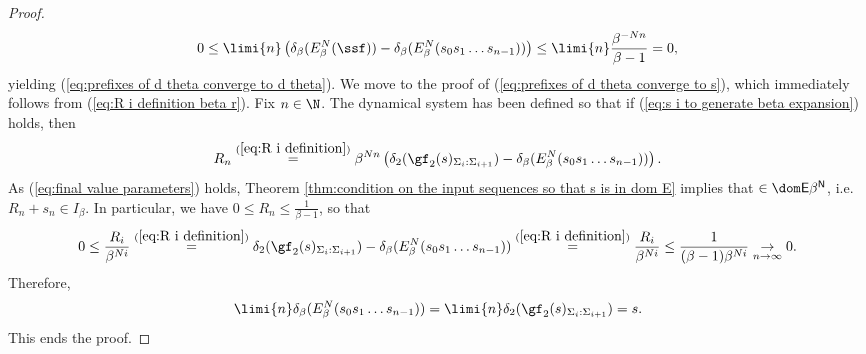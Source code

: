 \begin{proof}
	\begin{equation}
		0 \leq \limi{n} \left(\delta_\beta(E_\beta^N(\ssf)) - \delta_\beta(E_\beta^N(s_0s_1 \ldots s_{n-1}))\right) \leq \limi{n} \frac{\beta^{-Nn}}{\beta-1} = 0,
	\end{equation}
	yielding (\ref{eq:prefixes of d theta converge to d theta}). We move to the proof of (\ref{eq:prefixes of d theta converge to s}), which immediately follows from (\ref{eq:R i definition beta r}). Fix $n \in \N$. The dynamical system has been defined so that if (\ref{eq:s i to generate beta expansion}) holds, then 
	\begin{equation}
		R_n \overset{(\ref{eq:R i definition})}{=} \beta^{Nn}\left(\delta_2(\gf_2(s)_{\Sigma_i:\Sigma_{i+1}}) - \delta_\beta(E_\beta^N(s_0s_1 \ldots s_{n-1}))\right). 
	\end{equation}
	As (\ref{eq:final value parameters}) holds, Theorem \ref{thm:condition on the input sequences so that s is in dom E} implies that $\sf \in \dom E\beta^N$, i.e. $R_n + s_n \in I_\beta$. In particular, we have $0 \leq R_n \leq \frac{1}{\beta-1}$, so that
	\begin{equation}
		0 \leq \frac{R_i}{\beta^{Ni}} \overset{(\ref{eq:R i definition})}{=} \delta_2(\gf_2(s)_{\Sigma_i:\Sigma_{i+1}}) - \delta_\beta(E_\beta^N(s_0s_1 \ldots s_{n-1}))  \overset{(\ref{eq:R i definition})}{=} \frac{R_i}{\beta^{Ni}} \leq \frac{1}{(\beta-1) \beta^{Ni}} \underset{n \to \infty}{\to} 0.
	\end{equation}
	Therefore,
	\begin{equation}
		\limi{n} \delta_\beta(E_\beta^N(s_0s_1 \ldots s_{n-1})) = \limi{n} \delta_2(\gf_2(s)_{\Sigma_i:\Sigma_{i+1}}) = s.
	\end{equation}
	This ends the proof.

\end{proof}
